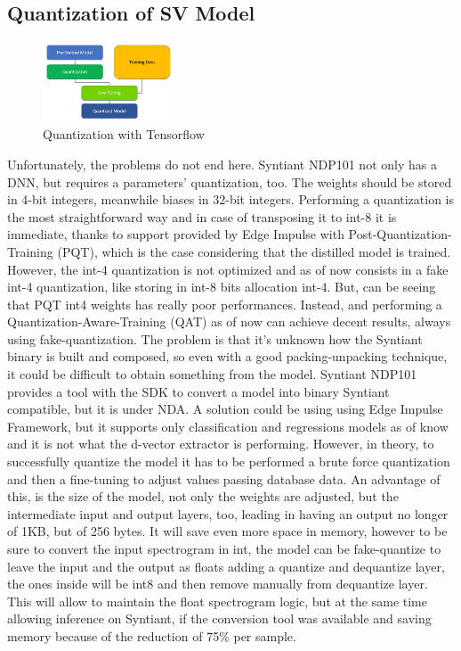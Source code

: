 \subsection{Quantization of SV Model}
\label{sec:quantization}
\begin{figure}
  \begin{center}
    \includegraphics[width=0.35\textwidth]{images/3.04 Quantization Flow.jpg}
  \end{center}
  \caption{Quantization with Tensorflow}
\end{figure}
Unfortunately, the problems do not end here. Syntiant NDP101 not only has a DNN, but requires a parameters' quantization, too. The weights should be stored in 4-bit\cite{description_ndp101} integers, meanwhile biases in 32-bit integers. Performing a quantization is the most straightforward way and in case of transposing it to int-8 it is immediate, thanks to support provided by Edge Impulse with Post-Quantization-Training (PQT)\cite{pqt_tensorflow}, which is the case considering that the distilled model is trained. However, the int-4 quantization is not optimized and as of now consists in a fake int-4 quantization, like storing in int-8 bits allocation int-4.\cite{wu2023understandingint4quantizationtransformer} But, can be seeing that PQT int4 weights has really poor performances. Instead, and performing a Quantization-Aware-Training (QAT)\cite{qat_tensorflow} as of now can achieve decent results, always using fake-quantization. The problem is that it's unknown how the Syntiant binary is built and composed, so even with a good packing-unpacking technique, it could be difficult to obtain something from the model. Syntiant NDP101 provides a tool with the SDK to convert a model into binary Syntiant compatible, but it is under NDA. A solution could be using using Edge Impulse Framework, but it supports only classification and regressions models as of know and it is not what the d-vector extractor is performing.\newline
However, in theory, to successfully quantize the model it has to be performed a brute force quantization and then a fine-tuning to adjust values passing database data. An advantage of this, is the size of the model, not only the weights are adjusted, but the intermediate input and output layers, too, leading in having an output no longer of 1KB, but of 256 bytes. It will save even more space in memory, however to be sure to convert the input spectrogram in int, the model can be fake-quantize to leave the input and the output as floats adding a quantize and dequantize layer, the ones inside will be int8 and then remove manually from dequantize layer. This will allow to maintain the float spectrogram logic, but at the same time allowing inference on Syntiant, if the conversion tool was available and saving memory because of the reduction of 75\% per sample.
